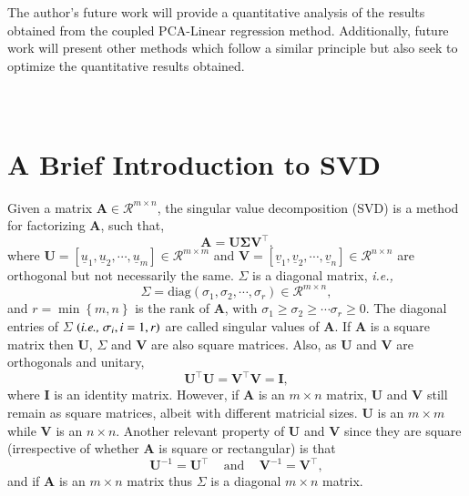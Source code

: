 \documentclass[preprint,12pt]{elsarticle}
\newcommand{\ie}{{\it i.e., }}
\begin{document}
The author's future work will provide a quantitative analysis of the results obtained from the coupled PCA-Linear regression method. Additionally, future work will present other methods which follow a similar principle but also seek to optimize the quantitative results obtained.



\clearpage
\appendix
\section{\\A Brief Introduction to SVD}\label{subsection:svd_brief}
Given a matrix $\mathbf{A}\in\mathcal{R}^{m\times n}$, the singular value decomposition (SVD) is a method for factorizing $\mathbf{A}$, such that,
\begin{equation}
  \mathbf{A} = \mathbf{U}\mathbf{\Sigma}\mathbf{V}^{\intercal}.
\end{equation}
where $\mathbf{U}=\left[\underline{u}_{1},\underline{u}_{2},\cdots,\underline{u}_{m}\right]\in\mathcal{R}^{m\times m}$ and $\mathbf{V}=\left[\underline{v}_{1},\underline{v}_{2},\cdots,\underline{v}_{n}\right]\in\mathcal{R}^{n\times n}$ are orthogonal but not necessarily the same. $\Sigma$ is a diagonal matrix, \ie
\begin{displaymath}
  \Sigma=\text{diag}\left(\sigma_{1},\sigma_{2},\cdots,\sigma_{r}\right)\in\mathcal{R}^{m\times n},
\end{displaymath}
and $r=\min\left\{m,n\right\}$ is the rank of $\mathbf{A}$, with $\sigma_{1}\ge\sigma_{2}\ge\cdots\sigma_{r}\ge 0$. The diagonal entries of $\Sigma$ $\left(\text{\ie} \sigma_{i}, i=1,r\right)$ are called singular values of $\mathbf{A}$. If $\mathbf{A}$ is a square matrix then $\mathbf{U}$, $\Sigma$ and $\mathbf{V}$ are also square matrices. Also, as $\mathbf{U}$ and $\mathbf{V}$ are orthogonals and unitary, 
\begin{equation}
  \mathbf{U}^{\intercal}\mathbf{U} = \mathbf{V}^{\intercal}\mathbf{V} = \mathbf{I},
\end{equation}
where $\mathbf{I}$ is an identity matrix. However, if $\mathbf{A}$ is an $m\times n$ matrix, $\mathbf{U}$ and $\mathbf{V}$ still remain as square matrices, albeit with different matricial sizes. $\mathbf{U}$ is an $m\times m$ while $\mathbf{V}$ is an $n\times n$. Another relevant property of $\mathbf{U}$ and $\mathbf{V}$ since they are square (irrespective of whether $\mathbf{A}$ is square or rectangular) is that
\begin{equation}
  \mathbf{U}^{-1} = \mathbf{U}^{\intercal} \;\;\;\text{ and }\;\;\; \mathbf{V}^{-1} = \mathbf{V}^{\intercal},
\end{equation}
and if $\mathbf{A}$ is an $m \times n$ matrix thus $\Sigma$ is a diagonal $m \times n$ matrix.
\end{document}
